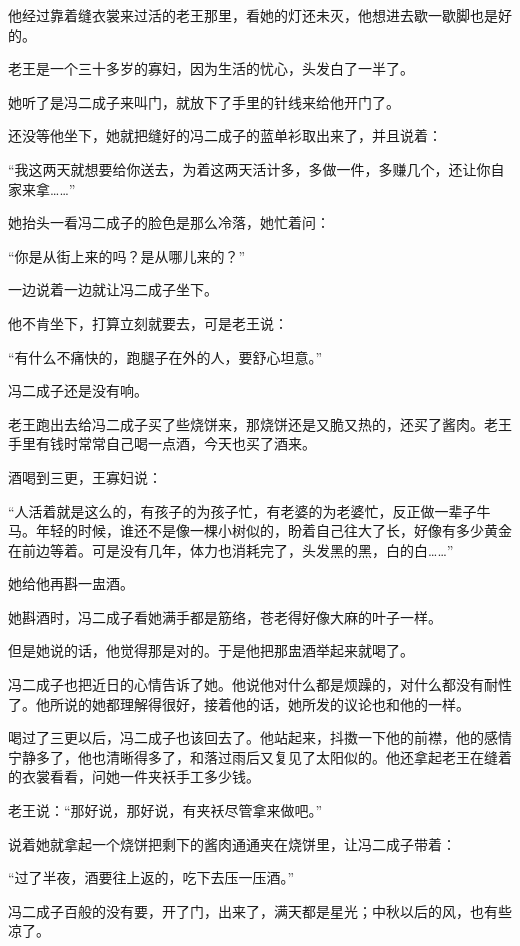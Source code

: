 \par 他经过靠着缝衣裳来过活的老王那里，看她的灯还未灭，他想进去歇一歇脚也是好的。
\par 老王是一个三十多岁的寡妇，因为生活的忧心，头发白了一半了。
\par 她听了是冯二成子来叫门，就放下了手里的针线来给他开门了。
\par 还没等他坐下，她就把缝好的冯二成子的蓝单衫取出来了，并且说着：
\par “我这两天就想要给你送去，为着这两天活计多，多做一件，多赚几个，还让你自家来拿……”
\par 她抬头一看冯二成子的脸色是那么冷落，她忙着问：
\par “你是从街上来的吗？是从哪儿来的？”
\par 一边说着一边就让冯二成子坐下。
\par 他不肯坐下，打算立刻就要去，可是老王说：
\par “有什么不痛快的，跑腿子在外的人，要舒心坦意。”
\par 冯二成子还是没有响。
\par 老王跑出去给冯二成子买了些烧饼来，那烧饼还是又脆又热的，还买了酱肉。老王手里有钱时常常自己喝一点酒，今天也买了酒来。
\par 酒喝到三更，王寡妇说：
\par “人活着就是这么的，有孩子的为孩子忙，有老婆的为老婆忙，反正做一辈子牛马。年轻的时候，谁还不是像一棵小树似的，盼着自己往大了长，好像有多少黄金在前边等着。可是没有几年，体力也消耗完了，头发黑的黑，白的白……”
\par 她给他再斟一盅酒。
\par 她斟酒时，冯二成子看她满手都是筋络，苍老得好像大麻的叶子一样。
\par 但是她说的话，他觉得那是对的。于是他把那盅酒举起来就喝了。
\par 冯二成子也把近日的心情告诉了她。他说他对什么都是烦躁的，对什么都没有耐性了。他所说的她都理解得很好，接着他的话，她所发的议论也和他的一样。
\par 喝过了三更以后，冯二成子也该回去了。他站起来，抖擞一下他的前襟，他的感情宁静多了，他也清晰得多了，和落过雨后又复见了太阳似的。他还拿起老王在缝着的衣裳看看，问她一件夹袄手工多少钱。
\par 老王说：“那好说，那好说，有夹袄尽管拿来做吧。”
\par 说着她就拿起一个烧饼把剩下的酱肉通通夹在烧饼里，让冯二成子带着：
\par “过了半夜，酒要往上返的，吃下去压一压酒。”
\par 冯二成子百般的没有要，开了门，出来了，满天都是星光；中秋以后的风，也有些凉了。
